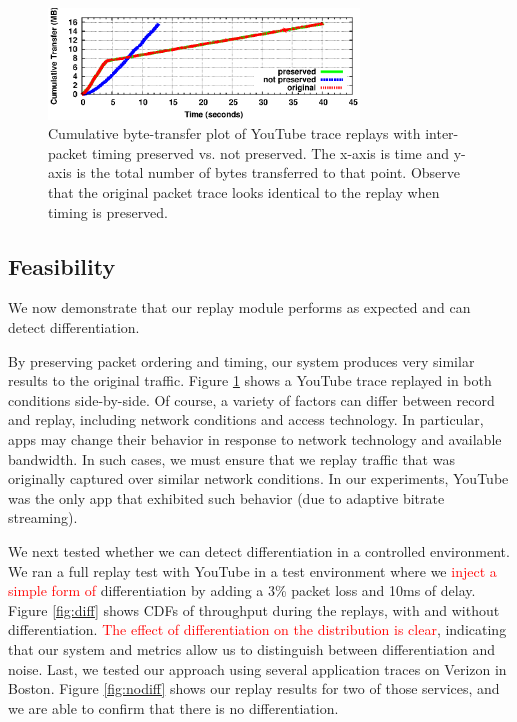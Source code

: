 \documentclass[letterpaper]{sig-alternate-2013}
\newcommand{\edit}[1]{\textcolor{red}{#1}}
\newcommand{\edit}[1]{\textcolor{black}{#1}}
\begin{document}
\begin{figure}[t]
	\centering
	\includegraphics[width=3.25in]{figures/double.eps}
	\caption{Cumulative byte-transfer plot of YouTube trace replays with inter-packet timing preserved vs. not preserved. The x-axis is time and y-axis is the total number of bytes transferred to that point. Observe that the original packet trace looks identical to the replay when timing is preserved. }
	\label{fig:double}
\end{figure}


\subsection{Feasibility}
We now demonstrate that our replay module performs as expected and can detect differentiation.

By preserving packet ordering and timing, our system produces very similar results to the original traffic. Figure \ref{fig:double} shows a YouTube trace replayed in both conditions side-by-side. Of course, a variety of factors can differ between record and replay, including network conditions and access technology. In particular, apps may change their behavior in response to network technology and available bandwidth. In such cases, we must ensure that we replay traffic that was originally captured over similar network conditions. In our experiments, YouTube was the only app that exhibited such behavior (due to adaptive bitrate streaming).

We next tested whether we can detect differentiation in a controlled environment. We ran a full replay test with YouTube in a test environment where we \edit{inject a simple form of} differentiation by adding a 3\% packet loss and 10ms of delay. Figure \ref{fig:diff} shows CDFs of throughput during the replays, with and without differentiation. \edit{The effect of differentiation on the distribution is clear}, indicating that our system and metrics allow us to distinguish between differentiation and noise. Last, we tested our approach using several application traces on Verizon in Boston. Figure \ref{fig:nodiff} shows our replay results for two of those services, and we are able to confirm that there is no differentiation.
\end{document}
